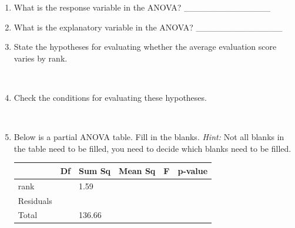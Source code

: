 \documentclass[12pt]{article}
\newcommand{\soln}[2]{$\:$\\ \vspace{#1}}{}
\begin{document}
\begin{enumerate}

\item What is the response variable in the ANOVA? \_\_\_\_\_\_\_\_\_\_\_\_\_\_ \soln{0cm}{Eval score}

\item What is the explanatory variable in the ANOVA? \_\_\_\_\_\_\_\_\_\_\_\_\_\_ \soln{0cm}{Rank}

\item State the hypotheses for evaluating whether the average evaluation score varies by rank.

\soln{5cm}{
$H_0$: Average eval score does not vary by rank. \\
$H_A$: Average eval scores are different for at least one pair of ranks.
}

\vfill

\pagebreak

\item Check the conditions for evaluating these hypotheses.

\soln{3cm}{
\begin{enumerate}
\item Independent observations: We don't know if there is random sampling + each group less than 10\% of its respective population
\item Normality: Distributions of each group not normal (left skewed) but n is large so not a huge deal
\item Constant variance: Variability across groups somewhat consistent
\end{enumerate}
}

\item Below is a partial ANOVA table. Fill in the blanks. \textit{Hint:} Not all blanks in the table need to be filled, 
you need to decide which blanks need to be filled.

\begin{center}
\renewcommand{\arraystretch}{1.5}
\begin{tabular}{l | p{1.5cm} | p{2cm} | p{2cm} | p{2cm} | p{2cm} }
  \hline
 			& Df 		& Sum Sq 	& Mean Sq 	& F 		 & p-value \\ 
  \hline
rank 			&  		& 1.59 		&  			& 	 	&  \\ 
\hline
Residuals 		& 	 	& 	 		& 	 		& 		&  \\ 
\hline
Total			&		& 136.66		&			&		&
\end{tabular}
\end{center}


\end{enumerate}
\end{document}
